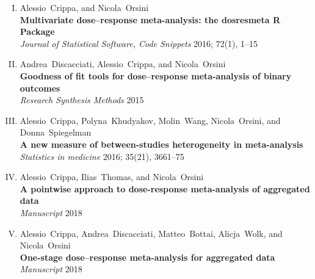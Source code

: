 \documentclass[11pt,a4paper,twoside,openany]{book}\usepackage{knitr}
\begin{document}
{\begin{enumerate}[I.]
\item Alessio~Crippa, and Nicola~Orsini \\ \textbf{Multivariate dose--response meta-analysis: the dosresmeta R Package} \\ \textit{Journal of Statistical Software, Code Snippets} 2016; 72(1), 1--15
\item Andrea~Discacciati, Alessio~Crippa, and Nicola~Orsini \\ \textbf{Goodness of fit tools for dose--response meta-analysis of binary outcomes} \\ \textit{Research Synthesis Methods} 2015
\item Alessio~Crippa, Polyna~Khudyakov, Molin~Wang, Nicola~Orsini, and Donna~Spiegelman \\ \textbf{A new measure of between-studies heterogeneity in meta-analysis} \\ \textit{Statistics in medicine} 2016; 35(21), 3661--75
\item Alessio~Crippa, Ilias~Thomas, and Nicola~Orsini \\ \textbf{A pointwise approach to dose-response meta-analysis of aggregated data} \\ \textit{Manuscript} 2018
\item Alessio~Crippa, Andrea~Discacciati, Matteo~Bottai, Alicja~Wolk, and Nicola~Orsini \\ \textbf{One-stage dose--response meta-analysis for aggregated data} \\ \textit{Manuscript} 2018
\end{enumerate}
\vspace{1.5cm}

}
\end{document}
